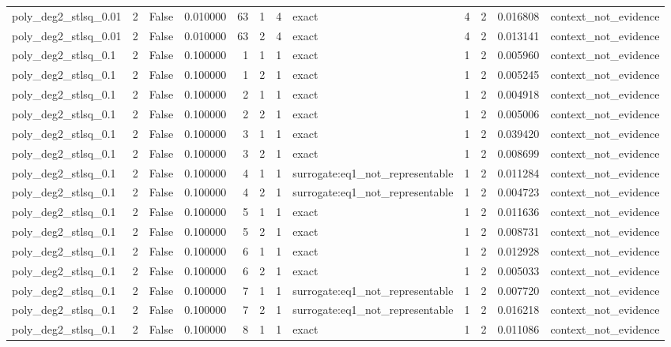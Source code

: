 \begin{tabular}{lrrrrrrlrrrl}
poly\_deg2\_stlsq\_0.01 & 2 & False & 0.010000 & 63 & 1 & 4 & exact & 4 & 2 & 0.016808 & context\_not\_evidence \\
poly\_deg2\_stlsq\_0.01 & 2 & False & 0.010000 & 63 & 2 & 4 & exact & 4 & 2 & 0.013141 & context\_not\_evidence \\
poly\_deg2\_stlsq\_0.1 & 2 & False & 0.100000 & 1 & 1 & 1 & exact & 1 & 2 & 0.005960 & context\_not\_evidence \\
poly\_deg2\_stlsq\_0.1 & 2 & False & 0.100000 & 1 & 2 & 1 & exact & 1 & 2 & 0.005245 & context\_not\_evidence \\
poly\_deg2\_stlsq\_0.1 & 2 & False & 0.100000 & 2 & 1 & 1 & exact & 1 & 2 & 0.004918 & context\_not\_evidence \\
poly\_deg2\_stlsq\_0.1 & 2 & False & 0.100000 & 2 & 2 & 1 & exact & 1 & 2 & 0.005006 & context\_not\_evidence \\
poly\_deg2\_stlsq\_0.1 & 2 & False & 0.100000 & 3 & 1 & 1 & exact & 1 & 2 & 0.039420 & context\_not\_evidence \\
poly\_deg2\_stlsq\_0.1 & 2 & False & 0.100000 & 3 & 2 & 1 & exact & 1 & 2 & 0.008699 & context\_not\_evidence \\
poly\_deg2\_stlsq\_0.1 & 2 & False & 0.100000 & 4 & 1 & 1 & surrogate:eq1\_not\_representable & 1 & 2 & 0.011284 & context\_not\_evidence \\
poly\_deg2\_stlsq\_0.1 & 2 & False & 0.100000 & 4 & 2 & 1 & surrogate:eq1\_not\_representable & 1 & 2 & 0.004723 & context\_not\_evidence \\
poly\_deg2\_stlsq\_0.1 & 2 & False & 0.100000 & 5 & 1 & 1 & exact & 1 & 2 & 0.011636 & context\_not\_evidence \\
poly\_deg2\_stlsq\_0.1 & 2 & False & 0.100000 & 5 & 2 & 1 & exact & 1 & 2 & 0.008731 & context\_not\_evidence \\
poly\_deg2\_stlsq\_0.1 & 2 & False & 0.100000 & 6 & 1 & 1 & exact & 1 & 2 & 0.012928 & context\_not\_evidence \\
poly\_deg2\_stlsq\_0.1 & 2 & False & 0.100000 & 6 & 2 & 1 & exact & 1 & 2 & 0.005033 & context\_not\_evidence \\
poly\_deg2\_stlsq\_0.1 & 2 & False & 0.100000 & 7 & 1 & 1 & surrogate:eq1\_not\_representable & 1 & 2 & 0.007720 & context\_not\_evidence \\
poly\_deg2\_stlsq\_0.1 & 2 & False & 0.100000 & 7 & 2 & 1 & surrogate:eq1\_not\_representable & 1 & 2 & 0.016218 & context\_not\_evidence \\
poly\_deg2\_stlsq\_0.1 & 2 & False & 0.100000 & 8 & 1 & 1 & exact & 1 & 2 & 0.011086 & context\_not\_evidence \\

\end{tabular}
